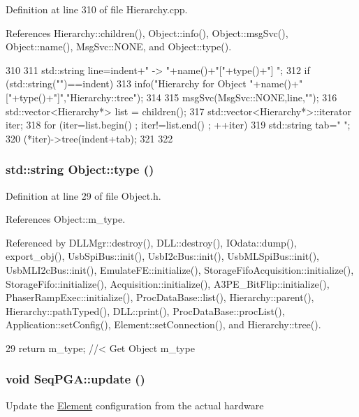 Definition at line 310 of file Hierarchy.cpp.

References Hierarchy::children(), Object::info(), Object::msgSvc(), Object::name(), MsgSvc::NONE, and Object::type().


\begin{DoxyCode}
310                                     {
311   std::string line=indent+" -> "+name()+"["+type()+"] ";
312   if (std::string("")==indent){
313     info("Hierarchy for Object "+name()+"["+type()+"]","Hierarchy::tree");
314   }
315   msgSvc(MsgSvc::NONE,line,"");
316   std::vector<Hierarchy*> list = children();
317   std::vector<Hierarchy*>::iterator iter;
318   for (iter=list.begin() ; iter!=list.end() ; ++iter){
319     std::string tab="  ";
320     (*iter)->tree(indent+tab);
321   }
322 }
\end{DoxyCode}
\hypertarget{classObject_a84f99f70f144a83e1582d1d0f84e4e62}{
\subsubsection[{type}]{\setlength{\rightskip}{0pt plus 5cm}std::string Object::type ()}}
\label{classObject_a84f99f70f144a83e1582d1d0f84e4e62}


Definition at line 29 of file Object.h.

References Object::m\_\-type.

Referenced by DLLMgr::destroy(), DLL::destroy(), IOdata::dump(), export\_\-obj(), UsbSpiBus::init(), UsbI2cBus::init(), UsbMLSpiBus::init(), UsbMLI2cBus::init(), EmulateFE::initialize(), StorageFifoAcquisition::initialize(), StorageFifo::initialize(), Acquisition::initialize(), A3PE\_\-BitFlip::initialize(), PhaserRampExec::initialize(), ProcDataBase::list(), Hierarchy::parent(), Hierarchy::pathTyped(), DLL::print(), ProcDataBase::procList(), Application::setConfig(), Element::setConnection(), and Hierarchy::tree().


\begin{DoxyCode}
29 { return m_type;       } //< Get Object m_type
\end{DoxyCode}
\hypertarget{classSeqPGA_a0003d286a27a82024d84b392edab2c3b}{
\subsubsection[{update}]{\setlength{\rightskip}{0pt plus 5cm}void SeqPGA::update ()}}
\label{classSeqPGA_a0003d286a27a82024d84b392edab2c3b}
Update the \hyperlink{classElement}{Element} configuration from the actual hardware 

